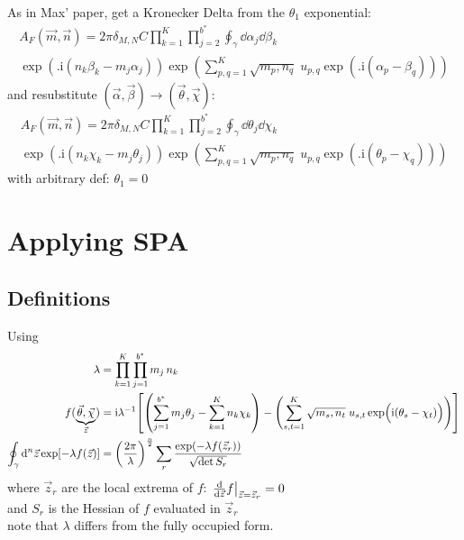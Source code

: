 \documentclass[
	english,
	a4paper,
	fontsize=10pt,
	parskip=half,
	titlepage=true,
	DIV=12,
	final
]{scrreprt}
\newcommand*{\iunit}{\ensuremath{\mathrm{i}}}
\begin{document}
As in Max' paper, get a Kronecker Delta from the $\theta_1$ exponential:
\begin{multline}	
	A_F(\vec{m}, \vec{n})
=
	2\pi \delta_{M,N} C
	\prod_{k=1}^{K}
	\prod_{j=2}^{b^*}
		\oint_{\gamma}
			\dd{\alpha_j} \dd{\beta_k}
\\
	\exp(
		\Big.
		\iunit(
		n_k \beta _k   -
		m_j \alpha_j
	))
	\exp(
		\sum_{p,q=1}^{K}
		\sqrt{m_p, n_q} \;
		u_{p,q}
		\exp(\Big.
			\iunit(\alpha_p - \beta_q)
		)
	)
\end{multline}
and resubstitute $(\vec{\alpha}, \vec{\beta}) \to (\vec{\theta}, \vec{\chi})$:
\begin{multline}	
	A_F(\vec{m}, \vec{n})
=
	2\pi \delta_{M,N} C
	\prod_{k=1}^{K}
	\prod_{j=2}^{b^*}
		\oint_{\gamma}
			\dd{\theta_j} \dd{\chi_k}
\\
	\exp(
		\Big.
		\iunit(
		n_k \chi  _k   -
		m_j \theta_j
	))
	\exp(
		\sum_{p,q=1}^{K}
		\sqrt{m_p, n_q} \;
		u_{p,q}
		\exp(\Big.
			\iunit(\theta_p - \chi_q)
		)
	)
\end{multline}
with arbitrary def: $\theta_1 = 0$

\section{Applying SPA}
\subsection{Definitions}
Using
\begin{align}
	\lambda
&=
	\prod_{k=1}^{K}
	\prod_{j=1}^{b^*}
		m_j \, n_k
\\
	f(
		\underbrace{ \vec{\theta}, \vec{\chi} }_{\vec{z}}
	)
&=
	\iunit
	\lambda^{-1}
	\qty[
		\qty(
			\sum_{j=1}^{b^*}
				m_j \theta_j   -
			\sum_{k=1}^{K}
				n_k \chi  _k
		)
	-
		\qty(
			\sum_{s,t=1}^{K}
			\sqrt{m_s, n_t} \;
			u_{s,t}
			\exp(\Big.
				\iunit(\theta_s - \chi_t)
			)
		)
	]
\\
	\oint_{\gamma} \dd[n]{\vec{z}}
		\exp[-\lambda f(\vec{z})]
&=
	\qty( \frac
		{2\pi}
		{\lambda}
	)^{\frac{n}{2}}
	\sum_{r}
		\frac
		{\exp(-\lambda f(\vec{z}_r))}
		{\sqrt{\det S_r}}
\label{eqn:def_SPA}
\end{align}
where $\vec{z}_r$ are the local extrema of $f$: $\eval{\dv{\vec{z}}f}_{\vec{z} = \vec{z}_r} = 0$\\
and $S_r$ is the Hessian of $f$ evaluated in $\vec{z}_r$\\
{\color{red} note that $\lambda$ differs from the fully occupied form.}
\end{document}
